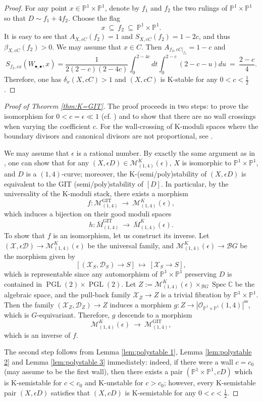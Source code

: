 \documentclass[a4paper,12pt]{amsart}
\newcommand{\ove}[1]{\overline{#1}}
\newcommand{\mtc}[1]{\mathcal{#1}}
\newcommand{\mts}[1]{\mathscr{#1}}
\DeclareMathOperator{\PGL}{PGL}
\DeclareMathOperator{\Spec}{Spec}
\DeclareMathOperator{\sst}{ss}
\DeclareMathOperator{\GIT}{GIT}
\newcommand{\bC}{{\mathbb C}}
\newcommand{\bP}{{\mathbb P}}
\newcommand{\cB}{{\mathcal{B}}}
\theoremstyle{definition}
\theoremstyle{remark}
\begin{document}
\begin{proof}
   For any point $x\in \bP^1\times\bP^1$, denote by $f_1$ and $f_2$ the two rulings of $\bP^1\times\bP^1$ so that $D\sim f_1+4f_2$. Choose the flag $$x\ \subseteq \ f_2 \ \subseteq \ \bP^1\times\bP^1.$$ It is easy to see that $A_{X,cC}(f_2)=1$ and $S_{X,cC}(f_2)=1-2c$, and thus $\beta_{X,cC}(f_2)>0$. We may assume that $x\in C$. Then $A_{f_2,cC|_{f_2}}=1-c$ and $$S_{f_2,cx}(W_{\bullet,\bullet},x)=\frac{1}{2(2-c)(2-4c)}\int_0^{2-4c}dt\int_0^{2-c}(2-c-u)du \ = \ \frac{2-c}{4}.$$ Therefore, one has $\delta_x(X,cC)>1$ and $(X,cC)$ is K-stable for any $0<c<\frac{1}{2}$.
\end{proof}




\begin{proof}[Proof of Theorem \ref{thm:K=GIT}]
    The proof proceeds in two steps: to prove the isomorphism for $0<c=\epsilon\ll1$ (cf. \cite[Theorem 1.11]{LZ24}) and to show that there are no wall crossings when varying the coefficient $c$. For the wall-crossing of K-moduli spaces where the boundary divisors and canonical divisors are not proportional, see \cite{LZ24b,LZ24}. 
    
    We may assume that $\epsilon$ is a rational number. By exactly the same argument as in \cite[Theorem 5.2]{ADL21}, one can show that for any $(X,\epsilon D)\in \mtc{M}^K_{(1,4)}(\epsilon)$, $X$ is isomorphic to $\bP^1\times\bP^1$, and $D$ is a $(1,4)$-curve; moreover, the K-(semi/poly)stability of $(X,\epsilon D)$ is equivalent to the GIT (semi/poly)stability of $[D]$. In particular, by the universality of the K-moduli stack, there exists a morphism $$f:\mtc{M}^{\GIT}_{(1,4)}\ \longrightarrow \ \mtc{M}^K_{(1,4)}(\epsilon),$$ which induces a bijection on their good moduli spaces $$h:\ove{M}^{\GIT}_{(1,4)}\ \longrightarrow \ \ove{M}^K_{(1,4)}(\epsilon).$$ To show that $f$ is an isomorphism, let us construct its inverse. Let $(\mts{X},\epsilon\mts{D})\rightarrow \mtc{M}^K_{(1,4)}(\epsilon)$ be the universal family, and $\mtc{M}^K_{(1,4)}(\epsilon)\rightarrow \cB G$ be the morphism given by $$[(\mts{X}_S,\mts{D}_S)\rightarrow S]\ \mapsto\  [\mts{X}_S \rightarrow S],$$ which is representable since any automorphism of $\bP^1\times \bP^1$ preserving $D$ is contained in $\PGL(2)\times\PGL(2)$. Let $Z:=\mtc{M}^K_{(1,4)}(\epsilon)\times_{\cB G}\Spec \bC$ be the algebraic space, and the pull-back family $\mts{X}_Z\rightarrow Z$ is a trivial fibration by $\bP^1\times\bP^1$. Then the family $(\mts{X}_Z,\mts{D}_Z)\rightarrow Z$ induces a morphism $g:Z\rightarrow |\mtc{O}_{\bP^1\times\bP^1}(1,4)|^{\sst}$, which is $G$-equivariant. Therefore, $g$ descends to a morphism $$\mtc{M}^K_{(1,4)}(\epsilon)\ \longrightarrow \ \mtc{M}^{\GIT}_{(1,4)},$$ which is an inverse of $f$.
    
    The second step follows from Lemma \ref{lem:polystable 1}, Lemma \ref{lem:polystable 2} and Lemma \ref{lem:polystable 3} immediately: indeed, if there were a wall $c=c_0$ (may assume to be the first wall), then there exists a pair $(\bP^1\times\bP^1,cD)$ which is K-semistable for $c<c_0$ and K-unstable for $c>c_0$; however, every K-semistable pair $(X,\epsilon D)$ satisfies that $(X,cD)$ is K-semistable for any $0<c<\frac{1}{2}$.
\end{proof}
\end{document}
